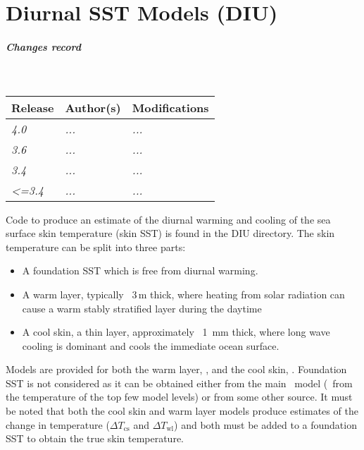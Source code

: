 \documentclass[../main/NEMO_manual]{subfiles}
\begin{document}
\chapter{Diurnal SST Models (DIU)}
\label{chap:DIU}

\thispagestyle{plain}

\chaptertoc

\paragraph{Changes record} ~\\

{\footnotesize
  \begin{tabularx}{\textwidth}{l||X|X}
    Release & Author(s) & Modifications \\
    \hline
    {\em   4.0} & {\em ...} & {\em ...} \\
    {\em   3.6} & {\em ...} & {\em ...} \\
    {\em   3.4} & {\em ...} & {\em ...} \\
    {\em <=3.4} & {\em ...} & {\em ...}
  \end{tabularx}
}

\clearpage

Code to produce an estimate of the diurnal warming and cooling of the sea surface skin
temperature (skin SST) is found in the DIU directory.
The skin temperature can be split into three parts:
\begin{itemize}
\item A foundation SST which is free from diurnal warming.
\item A warm layer, typically ~3\,m thick,
  where heating from solar radiation can cause a warm stably stratified layer during the daytime
\item A cool skin, a thin layer, approximately ~1\, mm thick,
  where long wave cooling is dominant and cools the immediate ocean surface.
\end{itemize}

Models are provided for both the warm layer, , and the cool skin, .
Foundation SST is not considered as it can be obtained either from the main \NEMO\ model
(\ie\ from the temperature of the top few model levels) or from some other source.
It must be noted that both the cool skin and warm layer models produce estimates of the change in temperature
($\Delta T_{\mathrm{cs}}$ and $\Delta T_{\mathrm{wl}}$) and
both must be added to a foundation SST to obtain the true skin temperature.
\end{document}
